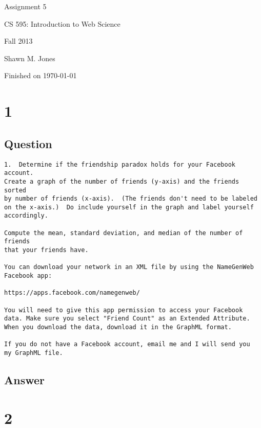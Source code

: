 \documentclass[letterpaper,11pt]{article}
\begin{document}
\begin{titlepage}

\begin{center}

\Huge{Assignment 5}

\Large{CS 595:  Introduction to Web Science}

\Large{Fall 2013}

\Large{Shawn M. Jones}

\Large Finished on \today

\end{center}

\end{titlepage}

\newpage
\section*{1}

\subsection*{Question}

\begin{verbatim}
1.  Determine if the friendship paradox holds for your Facebook account.  
Create a graph of the number of friends (y-axis) and the friends sorted
by number of friends (x-axis).  (The friends don't need to be labeled 
on the x-axis.)  Do include yourself in the graph and label yourself
accordingly.

Compute the mean, standard deviation, and median of the number of friends
that your friends have.

You can download your network in an XML file by using the NameGenWeb
Facebook app: 

https://apps.facebook.com/namegenweb/ 

You will need to give this app permission to access your Facebook
data. Make sure you select "Friend Count" as an Extended Attribute.
When you download the data, download it in the GraphML format.

If you do not have a Facebook account, email me and I will send you 
my GraphML file.
\end{verbatim}

\newpage
\subsection*{Answer}


\newpage
\section*{2}
\end{document}
